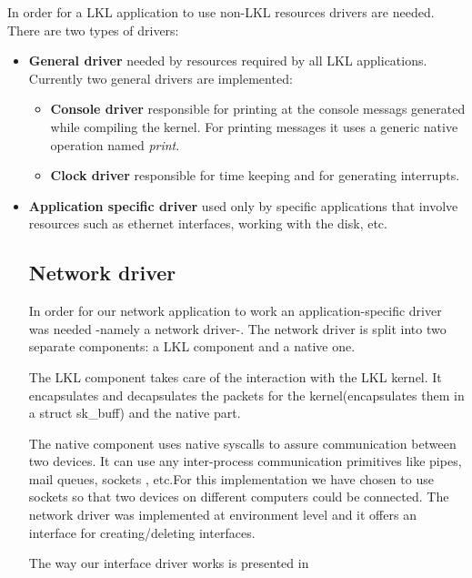 In order for a LKL application to use non-LKL resources drivers are needed. There are two types of drivers:
\begin{itemize}
\item \textbf{General driver} needed by resources required by all LKL applications. Currently two general drivers are implemented:
\begin{itemize}
\item \textbf{Console driver} responsible for printing at the console messags generated while compiling the kernel. For printing messages it uses a generic native operation named \textit{print}.
\item \textbf{Clock driver} responsible for time keeping and for generating interrupts.
\end{itemize}
\item \textbf{Application specific driver} used only by specific applications that involve resources such as ethernet interfaces, working with the disk, etc.

\subsection{Network driver}
\label{sec:net-driver}
In order for our network application to work an application-specific driver was needed -namely a network driver-. 
The network driver is split into two separate components: a LKL component and a native one.

The LKL component takes care of the interaction with the LKL kernel. It encapsulates
and decapsulates the packets for the kernel(encapsulates them in a struct sk_buff)
and the native part.

The native component uses native syscalls to assure communication between two devices.
It can use any inter-process communication primitives like pipes, mail queues, sockets
, etc.For this implementation we have chosen to use sockets so that two devices on different computers could be connected.
The network driver was implemented at environment level and it offers an interface for creating/deleting interfaces.

The way our interface driver works is presented in 


\end{itemize}
